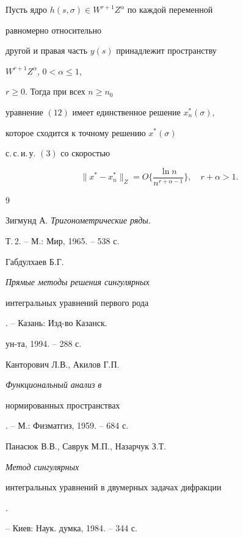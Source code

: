 \begin{thm} 


Пусть ядро $h(s,\sigma)\in W^{r+1}Z^\alpha$ по каждой переменной 


равномерно относительно 


другой и правая часть $y(s)$ принадлежит пространству


$W^{r+1}Z^\alpha$, $0<\alpha\le1$, 


$r\ge0$. Тогда при всех $n\ge n_0$ 


уравнение $(12)$ имеет единственное решение $x^*_n(\sigma)$, 


которое сходится к точному решению $x^*(\sigma)$


с.\,с.\,и.\,у. $(3)$ со скоростью 


$$ 


\|x^*-x^*_n\|_Z=O\bigg\{\frac{\ln n}{n^{r+\alpha-1}} 


\bigg\},\quad r+\alpha>1. 


$$ 


\end{thm} 


 


\begin{thebibliography}{9} 


 




Зигмунд А. {\em Тригонометрические ряды}. 


Т.\,2. -- М.: Мир, 1965. -- 538 с. 




Габдулхаев Б.Г. {\em Прямые методы решения сингулярных 


интегральных уравнений первого рода}. -- Казань: Изд-во Казанск. 


ун-та, 1994. -- 288 с. 




Канторович Л.В., Акилов Г.П. {\em Функциональный анализ в 


нормированных пространствах}. -- М.: Физматгиз, 1959. -- 684 с. 




Панасюк В.В., Саврук М.П., Назарчук З.Т. {\em Метод сингулярных 


интегральных уравнений в двумерных задачах дифракции}. 


-- Киев: Наук. думка, 1984. -- 344 с. 


 


 


\end{thebibliography} 


 


\vskip 2cm 


 








 


\label{end} 


 


